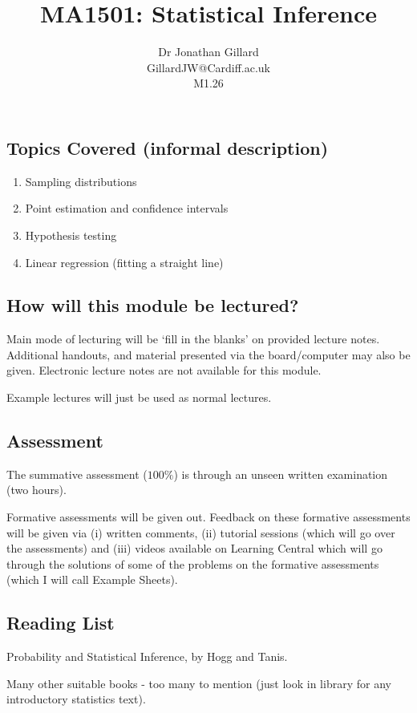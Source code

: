 \documentclass[12pt]{article}
\title{MA1501: Statistical Inference}
\author{Dr Jonathan Gillard\\GillardJW@Cardiff.ac.uk\\M1.26}
\date{}
\theoremstyle{break}
\begin{document}
\maketitle

\subsection*{Topics Covered (informal description)}
\begin{enumerate}
\item{Sampling distributions}
\item{Point estimation and confidence intervals}
\item{Hypothesis testing}
\item{Linear regression (fitting a straight line)}

\end{enumerate}

\subsection*{How will this module be lectured?}
Main mode of lecturing will be `fill in the blanks' on provided lecture notes.  Additional handouts, and material presented via the board/computer may also be given. Electronic lecture notes are not available for this module.

Example lectures will just be used as normal lectures.



\subsection*{Assessment}
The summative assessment ($100\%$) is through an unseen written examination (two hours).

Formative assessments will be given out. Feedback on these formative assessments will be given via (i) written comments, (ii) tutorial sessions (which will go over the assessments) and (iii) videos available on Learning Central which will go through the solutions of some of the problems on the formative assessments (which I will call Example Sheets).

\subsection*{Reading List}
Probability and Statistical Inference, by Hogg and Tanis.

Many other suitable books - too many to mention (just look in library for any introductory statistics text).
\end{document}

